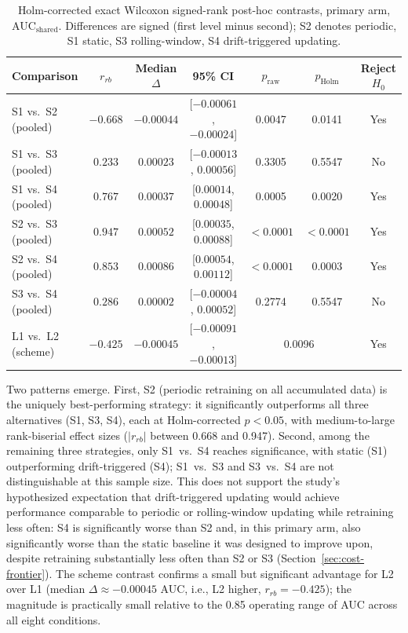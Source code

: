 \begin{table}[htbp]
  \centering
  \footnotesize
  \begin{tabular}{l c c c c c c}
    \toprule
    Comparison & $r_{rb}$ & Median $\Delta$ & 95\% CI & $p_{\text{raw}}$ & $p_{\text{Holm}}$ & Reject $H_0$ \\
    \midrule
    S1 vs.\ S2 (pooled) & $-0.668$ & $-0.00044$ & [$-0.00061$, $-0.00024$] & 0.0047 & 0.0141 & Yes \\
    S1 vs.\ S3 (pooled) & $0.233$ & $0.00023$ & [$-0.00013$, $0.00056$] & 0.3305 & 0.5547 & No \\
    S1 vs.\ S4 (pooled) & $0.767$ & $0.00037$ & [$0.00014$, $0.00048$] & 0.0005 & 0.0020 & Yes \\
    S2 vs.\ S3 (pooled) & $0.947$ & $0.00052$ & [$0.00035$, $0.00088$] & $<0.0001$ & $<0.0001$ & Yes \\
    S2 vs.\ S4 (pooled) & $0.853$ & $0.00086$ & [$0.00054$, $0.00112$] & $<0.0001$ & 0.0003 & Yes \\
    S3 vs.\ S4 (pooled) & $0.286$ & $0.00002$ & [$-0.00004$, $0.00052$] & 0.2774 & 0.5547 & No \\
    \midrule
    L1 vs.\ L2 (scheme) & $-0.425$ & $-0.00045$ & [$-0.00091$, $-0.00013$] & \multicolumn{2}{c}{0.0096} & Yes \\
    \bottomrule
  \end{tabular}
  \caption{Holm-corrected exact Wilcoxon signed-rank post-hoc contrasts, primary arm, $\text{AUC}_{\text{shared}}$. Differences are signed (first level minus second); S2 denotes periodic, S1 static, S3 rolling-window, S4 drift-triggered updating.}
  \label{tab:posthoc}
\end{table}

Two patterns emerge. First, S2 (periodic retraining on all accumulated data) is the uniquely best-performing strategy: it significantly outperforms all three alternatives (S1, S3, S4), each at Holm-corrected $p<0.05$, with medium-to-large rank-biserial effect sizes ($|r_{rb}|$ between 0.668 and 0.947). Second, among the remaining three strategies, only S1~vs.~S4 reaches significance, with static (S1) outperforming drift-triggered (S4); S1~vs.~S3 and S3~vs.~S4 are not distinguishable at this sample size. This does not support the study's hypothesized expectation that drift-triggered updating would achieve performance comparable to periodic or rolling-window updating while retraining less often: S4 is significantly worse than S2 and, in this primary arm, also significantly worse than the static baseline it was designed to improve upon, despite retraining substantially less often than S2 or S3 (Section~\ref{sec:cost-frontier}). The scheme contrast confirms a small but significant advantage for L2 over L1 (median $\Delta \approx -0.00045$ AUC, i.e., L2 higher, $r_{rb}=-0.425$); the magnitude is practically small relative to the 0.85 operating range of AUC across all eight conditions.

